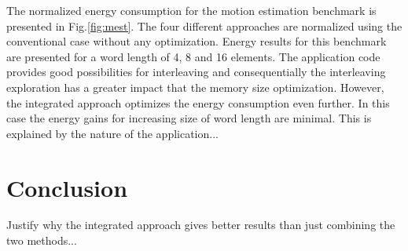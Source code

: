\documentclass[prodmode,acmtodaes]{acmsmall}
\begin{document}
The normalized energy consumption for the motion estimation benchmark is presented in Fig.\ref{fig:mest}.
The four different approaches are normalized using the conventional case without any optimization.
Energy results for this benchmark are presented for a word length of 4, 8 and 16 elements.
The application code provides good possibilities for interleaving and consequentially the interleaving exploration has a greater impact that the memory size optimization.
However, the integrated approach optimizes the energy consumption even further.
In this case the energy gains for increasing size of word length are minimal.
This is explained by the nature of the application...

\section{Conclusion}
\label{sec:conclusion}

Justify why the integrated approach gives better results than just combining the two methods...


\end{document}
